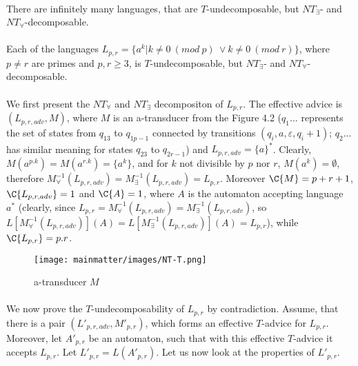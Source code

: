 \paragraph{}
\cveta There are infinitely many languages, that are $T$-undecomposable, but $NT_{\exists}$- and $NT_{\forall}$-decomposable.

\paragraph{}
\dokaz Each of the languages $L_{p,r} = \{a^k|k \neq 0\ (mod\  p)\ \vee k \neq 0\ (mod\  r)\}$, where $p \neq r$ are primes and $p,r \geq 3$, is $T$-undecomposable, but $NT_{\exists}$- and $NT_{\forall}$-decomposable.

\paragraph{}
We first present the $NT_{\forall}$ and $NT_{\exists}$ decompositon of $L_{p,r}$. The effective advice is $(L_{p,r,adv},M)$, where $M$ is an a-transducer from the Figure 4.2 ($q_1...$ represents the set of states from $q_{13}$ to $q_{1p-1}$ connected by transitions $(q_i,a,\varepsilon,q_i+1)$; $q_2...$ has similar meaning for states $q_{23}$ to $q_{2r-1}$) and $L_{p,r,adv} = \{a\}^*$. Clearly, $M(a^{p.k}) = M(a^{r.k}) = \{a^k\}$, and for $k$ not divisible by $p$ nor $r$, $M(a^k) = \emptyset$, therefore $M^{-1}_{\forall}(L_{p,r,adv}) = M^{-1}_{\exists}(L_{p,r,adv}) = L_{p,r}$. Moreover $\C{M} = p+r+1$, $\C{L_{p,r,adv}} = 1$ and $\C{A} = 1$, where $A$ is the automaton accepting language $a^*$ (clearly, since $L_{p,r} = M^{-1}_{\forall}(L_{p,r,adv}) = M^{-1}_{\exists}(L_{p,r,adv})$, so $L[M^{-1}_{\forall}(L_{p,r,adv})](A) = L[M^{-1}_{\exists}(L_{p,r,adv})](A) = L_{p,r}$), while $\C{L_{p,r}} = p.r$.

\begin{figure}[h!]
\centering
\texttt{[image: mainmatter/images/NT-T.png]}
\caption{a-transducer $M$}
\end{figure}

\paragraph{}
We now prove the $T$-undecomposability of $L_{p,r}$ by contradiction. Assume, that there is a pair $(L'_{p,r,adv},M'_{p,r})$, which forms an effective $T$-advice for $L_{p,r}$. Moreover, let $A'_{p,r}$ be an automaton, such that with this effective $T$-advice it accepts $L_{p,r}$. Let $L'_{p,r} = L(A'_{p,r})$. Let us now look at the properties of $L'_{p,r}$.

